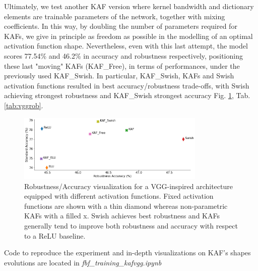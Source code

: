 \documentclass[LaM,binding=0.6cm]{./packages/sapthesis/sapthesis}
\begin{document}
        Ultimately, we test another KAF version where kernel bandwidth and dictionary elements are trainable parameters of the network, together with mixing coefficients. In this 
        way, by doubling the number of parameters required for KAFs, we give in principle as freedom as possible in the modelling of an optimal activation function shape. Nevertheless,
        even with this last attempt, the model scores 77.54\% and 46.2\% in accuracy and robustness respectively, positioning these last "moving" KAFs (KAF\_Free), 
        in terms of performances, under the previously used KAF\_Swish. In particular, KAF\_Swish, KAFs and Swish activation functions resulted in best accuracy/robustness trade-offs,
        with Swish achieving strongest robustness and KAF\_Swish strongest accuracy Fig. \ref{fig:accrob1}, Tab. \ref{tab:vggrob}.    
        \begin{figure}[h!]
            \centering
            \includegraphics[width=0.8\textwidth]{rob_af.png}
            \caption{Robustness/Accuracy visualization for a VGG-inspired architecture equipped with different activation functions. 
            Fixed activation functions are shown with a thin diamond whereas non-parametric KAFs with a filled x. Swish achieves best robustness and KAFs generally tend 
            to improve both robustness and accuracy with respect to a ReLU baseline.}
            \label{fig:accrob1}
        \end{figure}
        Code to reproduce the experiment and in-depth visualizations on KAF's shapes evolutions are located in \textit{fbf\_training\_kafvgg.ipynb}
\end{document}
